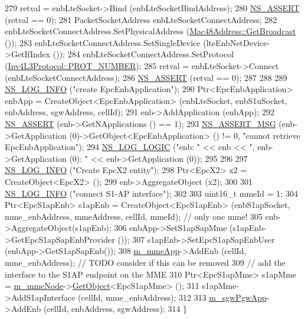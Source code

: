 \begin{DoxyCode}
279   retval = enbLteSocket->Bind (enbLteSocketBindAddress);
280   \hyperlink{assert_8h_a6dccdb0de9b252f60088ce281c49d052}{NS\_ASSERT} (retval == 0);  
281   PacketSocketAddress enbLteSocketConnectAddress;
282   enbLteSocketConnectAddress.SetPhysicalAddress (\hyperlink{classns3_1_1Mac48Address_a55156e302c6bf950c0b558365adbde84}{Mac48Address::GetBroadcast} ());
283   enbLteSocketConnectAddress.SetSingleDevice (lteEnbNetDevice->GetIfIndex ());
284   enbLteSocketConnectAddress.SetProtocol (\hyperlink{classns3_1_1Ipv4L3Protocol_a0146bc84815b7b73adb9c62cdafc9442}{Ipv4L3Protocol::PROT\_NUMBER});
285   retval = enbLteSocket->Connect (enbLteSocketConnectAddress);
286   \hyperlink{assert_8h_a6dccdb0de9b252f60088ce281c49d052}{NS\_ASSERT} (retval == 0);  
287   
288 
289   \hyperlink{group__logging_gafbd73ee2cf9f26b319f49086d8e860fb}{NS\_LOG\_INFO} (\textcolor{stringliteral}{"create EpcEnbApplication"});
290   Ptr<EpcEnbApplication> enbApp = CreateObject<EpcEnbApplication> (enbLteSocket, enbS1uSocket, enbAddress, 
      sgwAddress, cellId);
291   enb->AddApplication (enbApp);
292   \hyperlink{assert_8h_a6dccdb0de9b252f60088ce281c49d052}{NS\_ASSERT} (enb->GetNApplications () == 1);
293   \hyperlink{assert_8h_aff5ece9066c74e681e74999856f08539}{NS\_ASSERT\_MSG} (enb->GetApplication (0)->GetObject<EpcEnbApplication> () != 0, \textcolor{stringliteral}{"cannot
       retrieve EpcEnbApplication"});
294   \hyperlink{group__logging_ga88acd260151caf2db9c0fc84997f45ce}{NS\_LOG\_LOGIC} (\textcolor{stringliteral}{"enb: "} << enb << \textcolor{stringliteral}{", enb->GetApplication (0): "} << enb->GetApplication (0));
295 
296   
297   \hyperlink{group__logging_gafbd73ee2cf9f26b319f49086d8e860fb}{NS\_LOG\_INFO} (\textcolor{stringliteral}{"Create EpcX2 entity"});
298   Ptr<EpcX2> x2 = CreateObject<EpcX2> ();
299   enb->AggregateObject (x2);
300 
301   \hyperlink{group__logging_gafbd73ee2cf9f26b319f49086d8e860fb}{NS\_LOG\_INFO} (\textcolor{stringliteral}{"connect S1-AP interface"});
302 
303   uint16\_t mmeId = 1;
304   Ptr<EpcS1apEnb> s1apEnb = CreateObject<EpcS1apEnb> (enbS1apSocket, mme\_enbAddress, mmeAddress, cellId, 
      mmeId); \textcolor{comment}{// only one mme!}
305   enb->AggregateObject(s1apEnb);
306   enbApp->SetS1apSapMme (s1apEnb->GetEpcS1apSapEnbProvider ());
307   s1apEnb->SetEpcS1apSapEnbUser (enbApp->GetS1apSapEnb());
308   \hyperlink{classns3_1_1MmWavePointToPointEpcHelper_acee46bd21104461e8b459a309815dea9}{m\_mmeApp}->AddEnb (cellId, mme\_enbAddress); \textcolor{comment}{// TODO consider if this can be removed}
309   \textcolor{comment}{// add the interface to the S1AP endpoint on the MME}
310   Ptr<EpcS1apMme> s1apMme = \hyperlink{classns3_1_1MmWavePointToPointEpcHelper_a4e2e32e1abb0ca817e30be4eb46ebfd0}{m\_mmeNode}->\hyperlink{classns3_1_1Object_a13e18c00017096c8381eb651d5bd0783}{GetObject}<EpcS1apMme> ();
311   s1apMme->AddS1apInterface (cellId, mme\_enbAddress);
312   
313   \hyperlink{classns3_1_1MmWavePointToPointEpcHelper_a91427a039a393a8e4faaf4d08813d929}{m\_sgwPgwApp}->AddEnb (cellId, enbAddress, sgwAddress);
314 \}
\end{DoxyCode}


